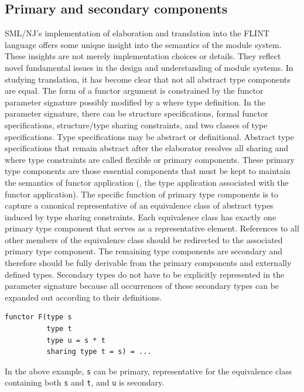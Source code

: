 \documentclass[12pt]{article}
\begin{document}
	\subsection{Primary and secondary components}
	SML/NJ's implementation of elaboration and translation into the FLINT language offers some unique insight into the semantics of the module system. These insights are not merely implementation choices or details. They reflect novel fundamental issues in the design and understanding of module systems. In studying translation, it has become clear that not all abstract type components are equal. The form of a functor argument is constrained by the functor parameter signature possibly modified by a where type definition. In the parameter signature, there can be structure specifications, formal functor specifications, structure/type sharing constraints, and two classes of type specifications. Type specifications may be abstract or definitional. Abstract type specifications that remain abstract after the elaborator resolves all sharing and where type constraints are called flexible or primary components. These primary type components are those essential components that must be kept to maintain the semantics of functor application (\ie, the type application associated with the functor application). The specific function of primary type components is to capture a canonical representative of an equivalence class of abstract types induced by type sharing constraints. Each equivalence class has exactly one primary type component that serves as a representative element. References to all other members of the equivalence class should be redirected to the associated primary type component. The remaining type components are secondary and therefore should be fully derivable from the primary components and externally defined types. Secondary types do not have to be explicitly represented in the parameter signature because all occurrences of these secondary types can be expanded out according to their definitions. 

\begin{lstlisting}
functor F(type s 
          type t 
          type u = s * t
          sharing type t = s) = ...
\end{lstlisting}

	In the above example, \verb|s| can be primary, representative for the equivalence class containing both \verb|s| and \verb|t|, and \verb|u| is secondary.  
\end{document}
